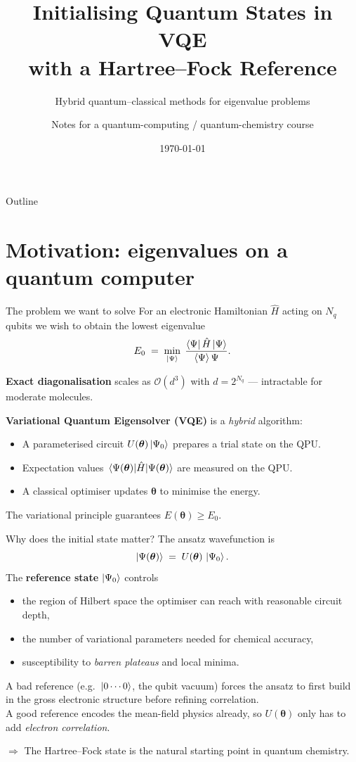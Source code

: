 \documentclass[10pt,aspectratio=169]{beamer}
\title[VQE \& Hartree--Fock]{Initialising Quantum States in VQE\\\large with a Hartree--Fock Reference}
\subtitle{Hybrid quantum--classical methods for eigenvalue problems}
\author{Notes for a quantum-computing / quantum-chemistry course}
\institute{}
\date{\today}
\begin{document}
\begin{frame}
\titlepage
\end{frame}

\begin{frame}{Outline}
\tableofcontents
\end{frame}

\section{Motivation: eigenvalues on a quantum computer}

\begin{frame}{The problem we want to solve}
For an electronic Hamiltonian $\hat H$ acting on $N_q$ qubits we wish to obtain the lowest eigenvalue
\[
E_0 \;=\; \min_{\ket{\Psi}}\; \frac{\bra{\Psi}\hat H \ket{\Psi}}{\braket{\Psi}{\Psi}} .
\]

\textbf{Exact diagonalisation} scales as $\mathcal{O}(d^3)$ with $d=2^{N_q}$ — intractable for moderate molecules.

\smallskip
\textbf{Variational Quantum Eigensolver (VQE)} is a \emph{hybrid} algorithm:
\begin{itemize}
  \item A parameterised circuit $U(\bm{\theta})\ket{\Psi_0}$ prepares a trial state on the QPU.
  \item Expectation values $\expval{\hat H}{\Psi(\bm{\theta})}$ are measured on the QPU.
  \item A classical optimiser updates $\bm{\theta}$ to minimise the energy.
\end{itemize}
The variational principle guarantees $E(\bm{\theta}) \geq E_0$.
\end{frame}

\begin{frame}{Why does the initial state matter?}
The ansatz wavefunction is
\[
\ket{\Psi(\bm{\theta})} \;=\; U(\bm{\theta})\,\ket{\Psi_0}.
\]
The \textbf{reference state} $\ket{\Psi_0}$ controls
\begin{itemize}
  \item the region of Hilbert space the optimiser can reach with reasonable circuit depth,
  \item the number of variational parameters needed for chemical accuracy,
  \item susceptibility to \emph{barren plateaus} and local minima.
\end{itemize}

\medskip
A bad reference (e.g.\ $\ket{0\cdots 0}$, the qubit vacuum) forces the ansatz to first build in the gross electronic structure before refining correlation.\\[2pt]
A good reference encodes the mean-field physics already, so $U(\bm{\theta})$ only has to add \emph{electron correlation}.

\medskip
$\Rightarrow$ The Hartree--Fock state is the natural starting point in quantum chemistry.
\end{frame}
\end{document}
